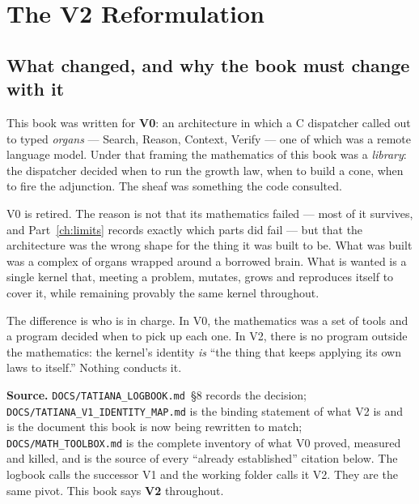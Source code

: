 \chapter{The V2 Reformulation}\label{ch:v2}

\section{What changed, and why the book must change with it}

This book was written for \textbf{V0}: an architecture in which a C\raisebox{0.2ex}{\small ++}
dispatcher called out to typed \emph{organs} --- Search, Reason, Context,
Verify --- one of which was a remote language model. Under that framing the
mathematics of this book was a \emph{library}: the dispatcher decided when
to run the growth law, when to build a cone, when to fire the adjunction.
The sheaf was something the code consulted.

V0 is retired. The reason is not that its mathematics failed --- most of it
survives, and Part~\ref{ch:limits} records exactly which parts did fail ---
but that the architecture was the wrong shape for the thing it was built to
be. What was built was a complex of organs wrapped around a borrowed brain.
What is wanted is a single kernel that, meeting a problem, mutates, grows and
reproduces itself to cover it, while remaining provably the same kernel
throughout.

\begin{intu}
\Intu The difference is who is in charge. In V0, the mathematics was a set of
tools and a program decided when to pick up each one. In V2, there is no
program outside the mathematics: the kernel's identity \emph{is} ``the thing
that keeps applying its own laws to itself.'' Nothing conducts it.
\end{intu}

\begin{sourcebox}\small\textsf{\textbf{Source.}}
\texttt{DOCS/TATIANA\_LOGBOOK.md}~\S8 records the decision;
\texttt{DOCS/TATIANA\_V1\_IDENTITY\_MAP.md} is the binding statement of what
V2 is and is the document this book is now being rewritten to match;
\texttt{DOCS/MATH\_TOOLBOX.md} is the complete inventory of what V0 proved,
measured and killed, and is the source of every ``already established''
citation below. The logbook calls the successor V1 and the working folder
calls it V2. They are the same pivot. This book says \textbf{V2} throughout.
\end{sourcebox}

